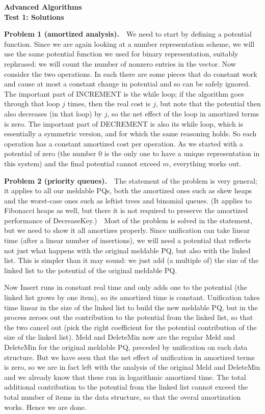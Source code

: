 \documentclass[11pt,a4paper]{article}
\begin{document}
\thispagestyle{empty}

\begin{center}
  \bf
  Advanced Algorithms\\
  Test 1: Solutions
\end{center}

\bigskip\noindent
\textbf{Problem 1 (amortized analysis).}\ \ 
We need to start by defining a potential function.  Since we are again
looking at a number representation scheme, we will use the same potential
function we used for binary representation, suitably rephrased: we will
count the number of nonzero entries in the vector.
Now consider the two operations.  In each there are some pieces that do
constant work and cause at most a constant change in potential and so
can be safely ignored.  The important part of INCREMENT is the while loop;
if the algorithm goes through that loop $j$ times, then the real cost is
$j$, but note that the potential then also decreases (in that loop) by $j$,
so the net effect of the loop in amortized terms is zero.  The important
part of DECREMENT is also its while loop, which is essentially a symmetric
version, and for which the same reasoning holds.  So each operation has
a constant amortized cost per operation.  As we started with a potential
of zero (the number 0 is the only one to have a unique representation in
this system) and the final potential cannot exceed $m$, everything works out.

\bigskip\noindent
\textbf{Problem 2 (priority queues).}\ \ 
The statement of the problem is very general; it applies to all our meldable
PQs, both the amortized ones such as skew heaps and the worst-case ones such
as leftist trees and binomial queues.  (It applies to Fibonacci heaps as well,
but there it is not required to preserve the amortized performance of
DecreaseKey.)\ \ Most of the problem is solved in the statement, but we need
to show it all amortizes properly.  Since unification can take linear time
(after a linear number of insertions), we will need a potential that reflects
not just what happens with the original meldable PQ, but also with the
linked list.  This is simpler than it may sound: we just add (a multiple of)
the size of the linked list to the potential
of the original meldable PQ.

Now Insert runs in constant real time and
only adds one to the potential (the linked list grows by one item), so
its amortized time is constant.  Unification takes time linear in the
size of the linked list to build the new meldable PQ, but in the process
zeroes out the contribution to the potential from the linked list, so that
the two cancel out (pick the right coefficient for the potential contribution
of the size of the linked list).  Meld and DeleteMin now are the regular Meld
and DeleteMin for the original meldable PQ, preceded by unification on
each data structure.  But we have seen that the net effect of unification
in amortized terms is zero, so we are in fact left with the analysis of
the original Meld and DeleteMin and we already know that these run in
logarithmic amortized time.  The total additional contribution to the potential
from the linked list cannot exceed the total number of items in the data
structure, so that the overal amortization works.  Hence we are done.
\end{document}
